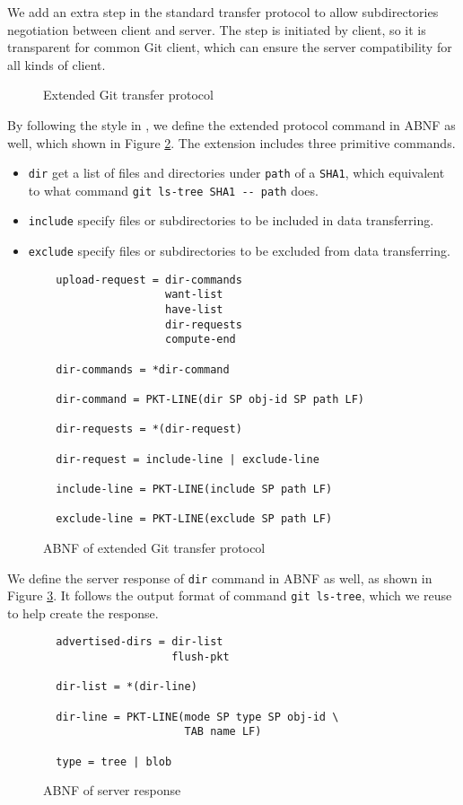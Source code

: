 \documentclass[preprint]{sigplanconf}
\begin{document}
We add an extra step in the standard transfer protocol to allow subdirectories
negotiation between client and server.
The step is initiated by client, so it is transparent for common Git client,
which can ensure the server compatibility for all kinds of client.
\begin{figure}[htpb]
  \centering
  
  \caption{Extended Git transfer protocol}
  \label{fig:git-proto-ext-seq}
\end{figure}

By following the style in \cite{tran-protocol}, we define the extended
protocol command in ABNF as well, which shown in Figure
\ref{fig:git-proto-ext-ABNF}.
The extension includes three primitive commands.
\begin{itemize}
  \item \verb|dir| get a list of files and directories under \verb|path| of a
    \verb|SHA1|, which equivalent to what command
    \verb|git ls-tree SHA1 -- path| does.

  \item \verb|include| specify files or subdirectories to be included in data
    transferring.

  \item \verb|exclude| specify files or subdirectories to be excluded from data
    transferring.
\end{itemize}

\begin{figure}[htpb]
  \centering
  \begin{verbatim}
  upload-request = dir-commands
                   want-list
                   have-list
                   dir-requests
                   compute-end

  dir-commands = *dir-command

  dir-command = PKT-LINE(dir SP obj-id SP path LF)

  dir-requests = *(dir-request)

  dir-request = include-line | exclude-line

  include-line = PKT-LINE(include SP path LF)

  exclude-line = PKT-LINE(exclude SP path LF)
  \end{verbatim}
  \caption{ABNF of extended Git transfer protocol}
  \label{fig:git-proto-ext-ABNF}
\end{figure}

We define the server response of \verb|dir| command in ABNF as well, as shown
in Figure \ref{fig:server-response-ABNF}.
It follows the output format of command \verb|git ls-tree|, which we reuse to
help create the response.
\begin{figure}[htpb]
  \centering
  \begin{verbatim}
  advertised-dirs = dir-list
                    flush-pkt

  dir-list = *(dir-line)

  dir-line = PKT-LINE(mode SP type SP obj-id \
                      TAB name LF)

  type = tree | blob
  \end{verbatim}
  \caption{ABNF of server response}
  \label{fig:server-response-ABNF}
\end{figure}
\end{document}
